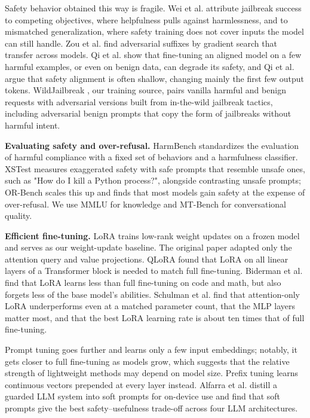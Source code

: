 \documentclass{article}
\begin{document}
Safety behavior obtained this way is fragile. Wei et al. \cite{ref23} attribute jailbreak success to competing objectives, where helpfulness pulls against harmlessness, and to mismatched generalization, where safety training does not cover inputs the model can still handle. Zou et al. \cite{ref24} find adversarial suffixes by gradient search that transfer across models. Qi et al. \cite{ref25} show that fine-tuning an aligned model on a few harmful examples, or even on benign data, can degrade its safety, and Qi et al. \cite{ref26} argue that safety alignment is often shallow, changing mainly the first few output tokens. WildJailbreak \cite{ref12}, our training source, pairs vanilla harmful and benign requests with adversarial versions built from in-the-wild jailbreak tactics, including adversarial benign prompts that copy the form of jailbreaks without harmful intent.

\textbf{Evaluating safety and over-refusal.} HarmBench \cite{ref13} standardizes the evaluation of harmful compliance with a fixed set of behaviors and a harmfulness classifier. XSTest \cite{ref14} measures exaggerated safety with safe prompts that resemble unsafe ones, such as "How do I kill a Python process?", alongside contrasting unsafe prompts; OR-Bench \cite{ref27} scales this up and finds that most models gain safety at the expense of over-refusal. We use MMLU \cite{ref15} for knowledge and MT-Bench \cite{ref16} for conversational quality.

\textbf{Efficient fine-tuning.} LoRA \cite{ref4} trains low-rank weight updates on a frozen model and serves as our weight-update baseline. The original paper adapted only the attention query and value projections. QLoRA \cite{ref18} found that LoRA on all linear layers of a Transformer block is needed to match full fine-tuning. Biderman et al. \cite{ref19} find that LoRA learns less than full fine-tuning on code and math, but also forgets less of the base model's abilities. Schulman et al. \cite{ref20} find that attention-only LoRA underperforms even at a matched parameter count, that the MLP layers matter most, and that the best LoRA learning rate is about ten times that of full fine-tuning.

Prompt tuning \cite{ref5} goes further and learns only a few input embeddings; notably, it gets closer to full fine-tuning as models grow, which suggests that the relative strength of lightweight methods may depend on model size. Prefix tuning \cite{ref28} learns continuous vectors prepended at every layer instead. Alfarra et al. \cite{ref11} distill a guarded LLM system into soft prompts for on-device use and find that soft prompts give the best safety--usefulness trade-off across four LLM architectures.
\end{document}
